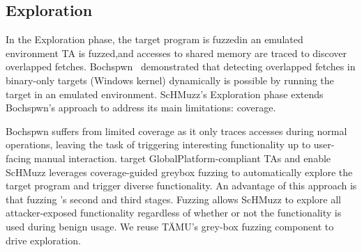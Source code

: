 \documentclass[conference]{IEEEtran} %
\newcommand{\sysname}{ScHMuzz\xspace}
\newcommand{\stageone}{Exploration\xspace}
\providecommand{\DIFaddtex}[1]{{\protect\color{blue} \sf #1}} %
\providecommand{\DIFdeltex}[1]{{\protect\color{red} \scriptsize #1}} %
\providecommand{\DIFaddbegin}{} %
\providecommand{\DIFaddend}{} %
\providecommand{\DIFdelbegin}{} %
\providecommand{\DIFdelend}{} %
\providecommand{\DIFadd}[1]{\texorpdfstring{\DIFaddtex{#1}}{#1}} %
\providecommand{\DIFdel}[1]{\texorpdfstring{\DIFdeltex{#1}}{}} %
\begin{document}
\subsection{\stageone}

In the \stageone phase, the target \DIFdelbegin \DIFdel{program is fuzzedin an emulated environment}\DIFdelend \DIFaddbegin \DIFadd{TA is fuzzed}\DIFaddend ,and accesses to shared memory are traced to 
discover overlapped fetches. Bochspwn~\cite{bochspwn} 
demonstrated that detecting overlapped fetches in binary-only targets (Windows kernel) dynamically 
is possible by running the target in an emulated environment. 
\sysname's \stageone phase extends Bochspwn's approach to \DIFdelbegin \DIFdel{address its main limitations: coverage.
}%

\DIFdel{Bochspwn suffers from limited coverage as it only traces accesses during normal operations, 
leaving the task of triggering interesting functionality up to user-facing manual interaction.
}\DIFdelend \DIFaddbegin \DIFadd{target GlobalPlatform-compliant TAs 
and enable }\DIFaddend \sysname\DIFdelbegin \DIFdel{leverages coverage-guided greybox fuzzing to automatically explore the target program 
and trigger diverse functionality.
An advantage of this approach is that fuzzing }\DIFdelend \DIFaddbegin \DIFadd{'s second and third stages.
Fuzzing }\DIFaddend allows \sysname 
to explore all attacker-exposed functionality regardless of whether or not the functionality is 
used during benign usage. \DIFaddbegin \DIFadd{We reuse TÄMU's grey-box fuzzing component to drive exploration.
}

\DIFaddend 
\end{document}
